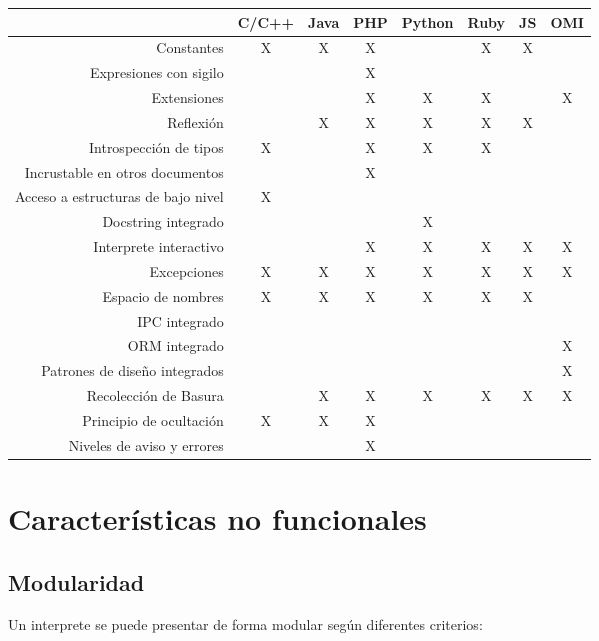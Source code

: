\FloatBarrier
\begin{table}[h]
\begin{center}
 
\begin{tabular}{|r|c|c|c|c|c|c|c|} \hline
 & C/C++ & Java & PHP  & Python & Ruby & JS & OMI\\ \hline
Constantes & X & X & X & & X & X &  \\ \hline
Expresiones con sigilo & & & X & & & &  \\ \hline
Extensiones & & & X & X & X &   & X \\ \hline
Reflexión & & X & X & X & X & X &  \\ \hline
Introspección de tipos & X & & X & X & X & &  \\ \hline
Incrustable en otros documentos & & & X &  & & &  \\ \hline
Acceso a estructuras de bajo nivel & X &  &  &  &  &  &  \\ \hline
Docstring integrado & & &  & X &   &  &  \\ \hline
Interprete interactivo & & & X & X & X & X & X \\ \hline
Excepciones  & X & X & X & X & X & X & X \\ \hline
Espacio de nombres & X & X & X & X & X & X &  \\ \hline
IPC integrado & & &  &  &  &  &  \\ \hline
ORM integrado & & & & & & & X \\ \hline
Patrones de diseño integrados & & & & & & & X \\ \hline
Recolección de Basura & & X & X & X & X & X & X \\ \hline 
Principio de ocultación &X & X & X & & & &  \\ \hline
Niveles de aviso y errores & & & X & & & &  \\ \hline
\end{tabular}
\end{center}
\end{table}
\FloatBarrier

\section {Características no funcionales}
\subsection{Modularidad}
Un interprete se puede presentar de forma modular según diferentes criterios:


